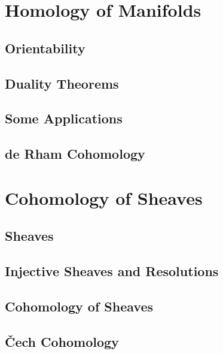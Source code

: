 \documentclass[11pt, a4paper]{article}
\begin{document}
\section{Homology of Manifolds}

\subsection{Orientability}

\subsection{Duality Theorems}

\subsection{Some Applications}

\subsection{de Rham Cohomology}

\section{Cohomology of Sheaves}

\subsection{Sheaves}

\subsection{Injective Sheaves and Resolutions}

\subsection{Cohomology of Sheaves}

\subsection{\v{C}ech Cohomology}
\end{document}
